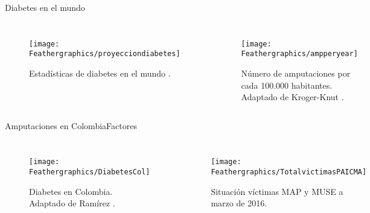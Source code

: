 \documentclass[10pt]{beamer}
\begin{document}
\begin{frame}{Diabetes en el mundo}
\begin{columns}[t]


\column{40 mm}
{\footnotesize{}}

\begin{figure}
\begin{centering}
\texttt{[image: Feathergraphics/proyecciondiabetes]}
\par\end{centering}
\caption{Estadísticas de diabetes en el mundo \cite{ref1}.}
\end{figure}

\column{75 mm}

\begin{figure}
\begin{centering}
\texttt{[image: Feathergraphics/ampperyear]}
\par\end{centering}
\caption{Número de amputaciones por cada 100.000 habitantes. Adaptado de Kroger-Knut \cite{KrogerKnut2015}. }
\end{figure}

\end{columns}

\end{frame}

\begin{frame}{Amputaciones en Colombia}{Factores}

\begin{columns}[t]


\column{70 mm}

\begin{figure}
\begin{centering}
\texttt{[image: Feathergraphics/DiabetesCol]}
\par\end{centering}
\caption{{\scriptsize{}Diabetes en Colombia. Adaptado de Ramírez \cite{Ramirez2014}. }}

\end{figure}


\column{40 mm}
\begin{figure}
\begin{centering}
\texttt{[image: Feathergraphics/TotalvictimasPAICMA]}
\caption{{\scriptsize{}Situación víctimas MAP y MUSE a marzo de 2016\cite{PAICMA}}.}
\end{centering}
\end{figure}

\end{columns}

\end{frame}
\end{document}
